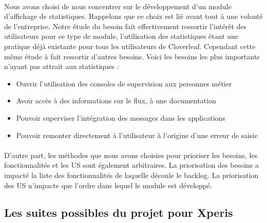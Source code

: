 			\paragraph{}%
			Nous avons choisi de nous concentrer sur le développement d'un module
			d'affichage de statistiques. Rappelons que ce choix est lié avant tout
			à une volonté de l'entreprise. Notre étude du besoin fait effectivement
			ressortir l'intérêt des utilisateurs pour ce type de module, l'utilisation
			des statistiques étant une pratique déjà existante pour tous les utilisateurs
			de Cloverleaf. Cependant cette même étude à fait ressortir d'autres besoins.
			Voici les besoins les plus importants n'ayant pas attrait aux statistiques :
			\begin{itemize}
			  \item Ouvrir l'utilisation des consoles de supervision aux personnes
			  métier
			  \item Avoir accès à des informations sur le flux, à une documentation
			  \item Pouvoir superviser l'intégration des messages dans les applications
			  \item Pouvoir remonter directement à l'utilisateur à l'origine d'une erreur
			  de saisie
			\end{itemize}
			
			\paragraph{}%
			D'autre part, les méthodes que nous avons choisies pour prioriser les
			besoins, les fonctionnalités et les US sont également arbitraires. La
			priorisation des besoins a impacté la liste des fonctionnalités de laquelle
			découle le backlog. La priorisation des US n'impacte que l'ordre
			dans lequel le module est développé.
			
		\subsection{Les suites possibles du projet pour Xperis}
